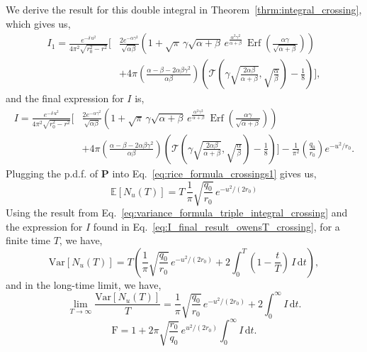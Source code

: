 \documentclass[journal]{IEEEtran}
\theoremstyle{plain}
\theoremstyle{definition}
\theoremstyle{remark}
\newcommand{\E}{\mathbb{E}}
\newcommand{\FF}{\mathrm{F}}
\newcommand{\Ot}{\mathcal{T}}
\newcommand{\Erf}{\operatorname{Erf}}
\newcommand{\Nu}{N_u(T)}
\newcommand{\dd}{\mathrm{d}}
\newcommand{\Var}{\text{Var}}
\begin{document}
We derive the result for this double integral in Theorem~\ref{thrm:integral_crossing}, which gives us,
\begin{equation}
\begin{split}
    I_1 = \frac{e^{-\delta\,u^2}}{4\pi^2\sqrt{r_0^2-r^2}} \Biggl[&\frac{2e^{-\alpha \gamma^2}}{\sqrt{\alpha\beta}} \left(1 + \sqrt{\pi} \, \gamma \sqrt{\alpha + \beta}  \, e^{\frac{\alpha^2 \gamma^2}{\alpha + \beta}}  \, \Erf\left(\frac{\alpha \gamma}{\sqrt{\alpha + \beta}}\right)\right) \\& + 4 \pi \left(\frac{\alpha - \beta - 2\alpha \beta \gamma^2}{\alpha\beta}\right) \left(\Ot\left(\gamma\sqrt{\frac{2\alpha\beta}{\alpha+\beta}}, \sqrt{\frac{\alpha}{\beta}}\right)-\frac{1}{8}\right)\Biggr],\label{eq:final_expr_for_I1_crossing}
\end{split}
\end{equation}
and the final expression for $I$ is,
\begin{equation}
\begin{aligned}
    I = \frac{e^{-\delta\,u^2}}{4\pi^2\sqrt{r_0^2-r^2}} \Biggl[&\frac{2e^{-\alpha \gamma^2}}{\sqrt{\alpha\beta}} \left(1 + \sqrt{\pi} \, \gamma \sqrt{\alpha + \beta}  \, e^{\frac{\alpha^2 \gamma^2}{\alpha + \beta}}  \, \Erf\left(\frac{\alpha \gamma}{\sqrt{\alpha + \beta}}\right)\right) \\& + 4 \pi \left(\frac{\alpha - \beta - 2\alpha \beta \gamma^2}{\alpha\beta}\right) \left(\Ot\left(\gamma\sqrt{\frac{2\alpha\beta}{\alpha+\beta}}, \sqrt{\frac{\alpha}{\beta}}\right)-\frac{1}{8}\right)\Biggr] - \frac{1}{\pi^2 }\left(\frac{q_0}{r_0}\right)e^{-u^2/r_0}.
\end{aligned} \label{eq:I_final_result_owensT_crossing}
\end{equation}
Plugging the p.d.f. of $\mathbf{P}$ into Eq.~\eqref{eq:rice_formula_crossings1} gives us,
\begin{equation}
    \E\left[\Nu\right] = T \, \frac{1}{\pi}\sqrt{\frac{q_0}{r_0}} \, e^{-u^2/(2r_0)} \label{eq:rice_formula_gaussian_crossing}
\end{equation}
Using the result from Eq.~\eqref{eq:variance_formula_triple_integral_crossing} and the expression for $I$ found in Eq.~\eqref{eq:I_final_result_owensT_crossing}, for a finite time $T$, we have,
\begin{equation}
    \Var\left[\Nu\right] = T \left(\frac{1}{\pi}\sqrt{\frac{q_0}{r_0}} \, e^{-u^2/(2r_0)} + 2\int_{0}^T \left(1-\frac{t}{T}\right)  \, I \, \dd t\right), \label{eq:variance_finite_time_final_crossing}
\end{equation}
and in the long-time limit, we have,
\begin{equation}
    \lim_{T \rightarrow \infty}\frac{\Var\left[\Nu\right]}{T} =  \frac{1}{\pi}\sqrt{\frac{q_0}{r_0}} \, e^{-u^2/(2r_0)} + 2\int_{0}^\infty I \, \dd t. \label{eq:variance_infinite_time_final_crossing}
\end{equation}
\begin{equation}
    \FF = 1 + 2 \pi \sqrt{\frac{r_0}{q_0}} \,e^{u^2/(2r_0)} \int_{0}^\infty I \, \dd t. \label{eq:fano_factor_final_crossing}
\end{equation}
\end{document}

